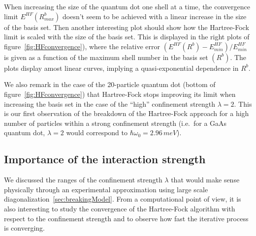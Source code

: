 When increasing the size of the quantum dot one shell at a time, the convergence limit $E^{HF}(R^b_{max})$ doesn't seem to be achieved with a linear increase in the size of the basis set. 
Then another interesting plot should show how the Hartree-Fock limit is scaled with the size of the basis set.
This is displayed in the right plots of figure~\ref{fig:HFconvergence}), where the relative error $\left( E^{HF}(R^b)-E^{HF}_{min}\right) /E^{HF}_{min}$ is given as a function of the maximum shell number in the basis set $(R^b)$. The plots display amost linear curves, implying a quasi-exponential dependence in $R^b$.
% 
% 


We also remark in the case of the 20-particle quantum dot (bottom of figure~\ref{fig:HFconvergence}) that Hartree-Fock stops improving its limit when increasing the basis set in the case of the ``high'' confinement strength $\lambda=2$. This is our first observation of the breakdown of the Hartree-Fock approach for a high number of particles within a strong confinement strength (i.e.\ for a GaAs quantum dot, $\lambda=2$ would correspond to $\hbar \omega_0=2.96 \, meV$).

\subsection{Importance of the interaction strength}
We discussed the ranges of the confinement strength $\lambda$ that would make sense physically through an experimental approximation using large scale diagonalization~\ref{sec:breakingModel}. From a computational point of view, it is also interesting to study the convergence of the Hartree-Fock algorithm with respect to the confinement strength and to observe how fast the iterative process is converging.

